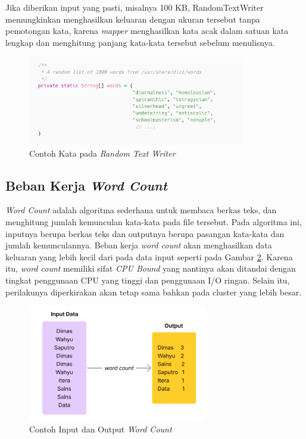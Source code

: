 Jika diberikan input yang pasti, misalnya 100 KB, RandomTextWriter memungkinkan menghasilkan keluaran dengan ukuran tersebut tanpa pemotongan kata, karena \textit{mapper} menghasilkan kata acak dalam satuan kata lengkap dan menghitung panjang kata-kata tersebut sebelum menulisnya.

\begin{figure}[h]
    \centering
    \includegraphics[width=0.85\textwidth]{figures/ch02/contoh-data}
    \caption{Contoh Kata pada \textit{Random Text Writer}}
    \label{fig:contoh-data}
\end{figure}


\subsection{Beban Kerja \textit{Word Count}}
\textit{Word Count} adalah algoritma sederhana untuk membaca berkas teks, dan menghitung jumlah kemunculan kata-kata pada file tersebut. Pada algoritma ini, inputnya berupa berkas teks dan outputnya berupa pasangan kata-kata dan jumlah kemunculannya. Beban kerja \textit{word count} akan menghasilkan data keluaran yang lebih kecil dari pada data input seperti pada Gambar \ref{fig:sample-wordcount}.
Karena itu, \textit{word count} memiliki sifat \textit{CPU Bound} yang nantinya akan ditandai dengan tingkat penggunaan CPU yang tinggi dan penggunaan I/O ringan. Selain itu, perilakunya diperkirakan akan tetap sama bahkan pada cluster yang lebih besar.

\begin{figure}[h]
    \centering
    \includegraphics[width=0.7\textwidth]{figures/ch02/sample-wordcount.png}
    \caption{Contoh Input dan Output \textit{Word Count}}
    \label{fig:sample-wordcount}
\end{figure}

